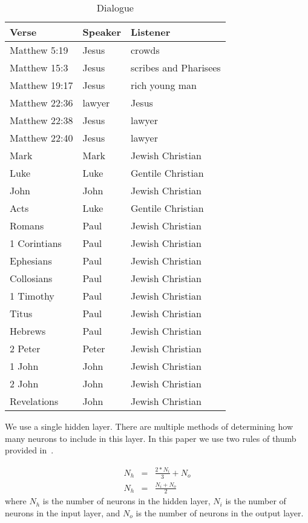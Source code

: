\documentclass{article}
\begin{document}
\begin{table}
    \centering
    \begin{tabular}{lll}
    \toprule
        Verse & Speaker & Listener \\
    \midrule
        Matthew 5:19 & Jesus & crowds \\
        Matthew 15:3 & Jesus & scribes and Pharisees \\
        Matthew 19:17 & Jesus & rich young man \\
        Matthew 22:36 & lawyer & Jesus \\
        Matthew 22:38 & Jesus & lawyer \\
        Matthew 22:40 & Jesus & lawyer \\
        Mark & Mark & Jewish Christian \\
        Luke & Luke & Gentile Christian \\
        John & John & Jewish Christian \\
        Acts & Luke & Gentile Christian \\
        Romans & Paul & Jewish Christian \\
        1 Corintians & Paul & Jewish Christian \\
        Ephesians & Paul & Jewish Christian \\
        Collosians & Paul & Jewish Christian \\
        1 Timothy & Paul & Jewish Christian \\
        Titus & Paul & Jewish Christian \\
        Hebrews & Paul & Jewish Christian \\
        2 Peter & Peter & Jewish Christian \\
        1 John & John & Jewish Christian \\
        2 John & John & Jewish Christian \\
        Revelations & John & Jewish Christian \\
    \bottomrule
    \end{tabular}
    \caption{Dialogue}
    \label{dialogue}
\end{table}

We use a single hidden layer.  There are multiple methods of determining how many neurons
to include in this layer.  In this paper we use two rules of thumb provided in~\cite{Heaton2008}.

\begin{eqnarray}
    N_h & = & \frac{2 * N_i}{3} + N_o\\
    N_h & = & \frac{N_i + N_o}{2}
\end{eqnarray}
where $N_h$ is the number of neurons in the hidden layer, $N_i$ is the number of neurons in the input
layer, and $N_o$ is the number of neurons in the output layer.
\end{document}
